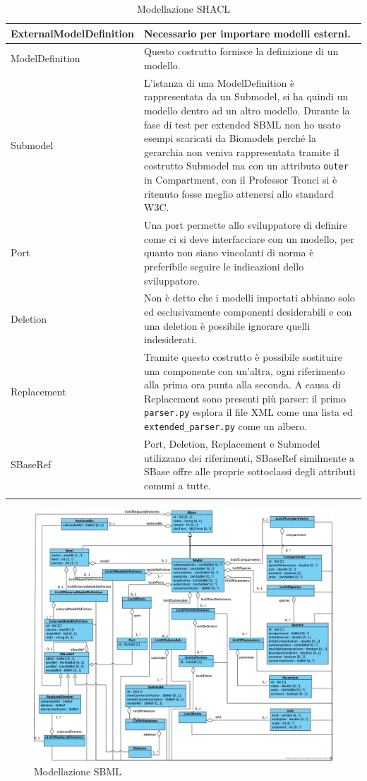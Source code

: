 \documentclass{article}
\begin{document}
\begin{longtable}{p{}p{}}
    \hline
    ExternalModelDefinition &  Necessario per importare modelli esterni. \\
    \hline
    ModelDefinition & Questo costrutto fornisce la definizione di un modello. \\ 
    \hline
    Submodel & L'istanza di una ModelDefinition è rappresentata da un Submodel, si ha quindi un modello dentro ad un altro modello. Durante la fase di test per extended SBML non ho usato esempi scaricati da Biomodels perché la gerarchia non veniva rappresentata tramite il costrutto Submodel ma con un attributo \texttt{outer} in Compartment, con il Professor Tronci si è ritenuto fosse meglio attenersi allo standard W3C. \\ 
    \hline
    Port & Una port permette allo sviluppatore di definire come ci si deve interfacciare con un modello, per quanto non siano vincolanti di norma è preferibile seguire le indicazioni dello sviluppatore. \\ 
    \hline
    Deletion & Non è detto che i modelli importati abbiano solo ed esclusivamente componenti desiderabili e con una deletion è possibile ignorare quelli indesiderati. \\
    \hline
    Replacement & Tramite questo costrutto è possibile sostituire una componente con un'altra, ogni riferimento alla prima ora punta alla seconda. A causa di Replacement sono presenti più parser: il primo \texttt{parser.py} esplora il file XML come una lista ed \texttt{extended\_parser.py} come un albero. \\
    \hline
    SBaseRef & Port, Deletion, Replacement e Submodel utilizzano dei riferimenti, SBaseRef similmente a SBase offre alle proprie sottoclassi degli attributi comuni a tutte. \\
    \hline

    \caption{Modellazione SHACL}
    \label{tab:modellazione}
\end{longtable}

\begin{figure}
    \caption{Modellazione SBML}
    \label{fig:diagram}
    \includegraphics[scale=0.6]{images/diagram.png}
\end{figure}
\clearpage
\end{document}
